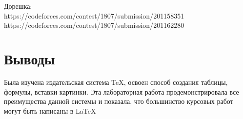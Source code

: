 \documentclass{article}
\begin{document}
Дорешка: \\
https://codeforces.com/contest/1807/submission/201158351 \\
https://codeforces.com/contest/1807/submission/201162280 \\

\section{Выводы}
Была изучена издательская система \TeX, освоен способ создания таблицы, формулы, вставки картинки. Эта лабораторная работа продемонстрировала все преимущества данной системы и показала, что большинство курсовых работ могут быть написаны в \LaTeX
\end{document}
